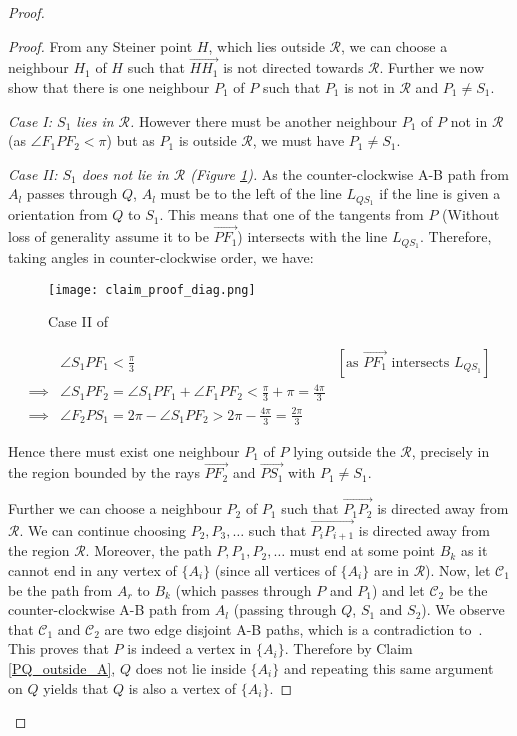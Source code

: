 \begin{proof}
\begin{proof}
    From any Steiner point $H$, which lies outside $\mathcal R$, we can choose a neighbour $H_1$ of $H$ such that $\overrightarrow{HH_1}$ is not directed towards $\mathcal R$. Further we now show that there is one neighbour $P_1$ of $P$ such that $P_1$ is not in $\mathcal R$ and $P_1 \neq S_1$. 

    \textit{Case I: $S_1$ lies in $\mathcal R$.} However there must be another neighbour $P_1$ of $P$ not in $\mathcal R$ (as $\angle F_1PF_2 < \pi$) but as $P_1$ is outside $\mathcal R$, we must have $P_1 \neq S_1$.
    
    \textit{Case II: $S_1$ does not lie in $\mathcal R$ (Figure \ref{steiner_path_from_A_to_A_fig}).} As the counter-clockwise A-B path from $A_l$ passes through $Q$, $A_l$ must be to the left of the line $L_{QS_1}$ if the line is given a orientation from $Q$ to $S_1$. This means that one of the tangents from $P$ (Without loss of generality assume it to be $\overrightarrow{PF_1}$) intersects with the line $L_{QS_1}$. Therefore, taking angles in counter-clockwise order, we have:
    
\begin{figure}[h]
\centering
\texttt{[image: claim\_proof\_diag.png]}
\caption{Case II of~}
\label{steiner_path_from_A_to_A_fig}
\end{figure}

    \begin{align*}
        & \angle S_1PF_1 < \frac{\pi}{3} & [\text{as } \overrightarrow{PF_1} \text{ intersects } L_{QS_1}] \\
        \implies & \angle S_1PF_2 = \angle S_1PF_1 + \angle F_1PF_2 < \frac{\pi}{3} + \pi = \frac{4 \pi}{3}\\
        \implies & \angle F_2PS_1 = 2 \pi - \angle S_1PF_2 > 2 \pi - \frac{4 \pi}{3} = \frac{2 \pi}{3}
    \end{align*}
    
    Hence there must exist one neighbour $P_1$ of $P$ lying outside the $\mathcal R$, precisely in the region bounded by the rays $\overrightarrow{PF_2}$ and $\overrightarrow{PS_1}$ with $P_1 \ne S_1$. 
    
    Further we can choose a neighbour $P_2$ of $P_1$ such that $\overrightarrow{P_1P_2}$ is directed away from $\mathcal R$. We can continue choosing $P_2, P_3, \ldots $ such that $\overrightarrow{P_iP_{i+1}}$ is directed away from the region $\mathcal R$. Moreover, the path  $P, P_1, P_2, \ldots$ must end at some point $B_k$ as it cannot end in any vertex of $\{A_i\}$ (since all vertices of $\{A_i\}$ are in $\mathcal R$). Now, let $\mathcal C_1$ be the path from $A_r$ to $B_k$ (which passes through $P$ and $P_1$) and let $\mathcal C_2$ be the counter-clockwise A-B path from $A_l$ (passing through $Q$, $S_1$ and $S_2$). We observe that $\mathcal C_1$ and $\mathcal C_2$ are two edge disjoint A-B paths, which is a contradiction to~. This proves that $P$ is indeed a vertex in $\{A_i\}$. Therefore by Claim \ref{PQ_outside_A}, $Q$ does not lie inside $\{A_i\}$ and repeating this same argument on $Q$ yields that $Q$ is also a vertex of $\{A_i\}$. 


\end{proof}
\end{proof}
